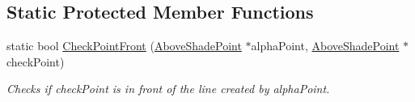 \subsection*{Static Protected Member Functions}
\begin{DoxyCompactItemize}
\item 
static bool \hyperlink{classlighting_1_1AboveLightSource_a31861d0bb4bfa3a25e2f88b1662e0744}{Check\+Point\+Front} (\hyperlink{classlighting_1_1AboveShadePoint}{Above\+Shade\+Point} $\ast$alpha\+Point, \hyperlink{classlighting_1_1AboveShadePoint}{Above\+Shade\+Point} $\ast$check\+Point)
\begin{DoxyCompactList}\small\item\em Checks if {\itshape check\+Point}  is in front of the line created by alpha\+Point. \end{DoxyCompactList}\end{DoxyCompactItemize}
